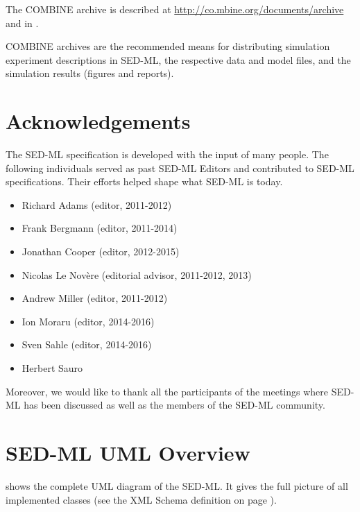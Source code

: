 \documentclass[pdftex,rgb,dvipsnames,svgnames,hyperref,table]{report}
\begin{document}
The COMBINE archive is described at \url{http://co.mbine.org/documents/archive} and 
in \citep{Bergmann2014}.

COMBINE archives are the recommended means for distributing simulation experiment descriptions in SED-ML, the respective data and model files, and the simulation results (figures and reports).

\chapter{Acknowledgements}
\label{sec:acknowledgments}
The SED-ML specification is developed with the input of many people. The following individuals served as past SED-ML Editors and contributed to SED-ML specifications. Their efforts helped shape what SED-ML is today.

\begin{itemize}
\item Richard Adams (editor, 2011-2012)
\item Frank Bergmann (editor, 2011-2014)
\item Jonathan Cooper (editor, 2012-2015)
\item Nicolas Le Novère (editorial advisor, 2011-2012, 2013)
\item Andrew Miller (editor, 2011-2012)
\item Ion Moraru (editor, 2014-2016)
\item Sven Sahle (editor, 2014-2016)
\item Herbert Sauro
\end{itemize}

Moreover, we would like to thank all the participants of the meetings where SED-ML has been discussed as well as the members of the SED-ML community.


\appendix
\chapter{SED-ML UML Overview}
 shows the complete UML diagram of the SED-ML. It gives the full picture of all implemented classes (see the XML Schema definition on page \pageref{lst:schema}).
\label{app:uml}

\end{document}
